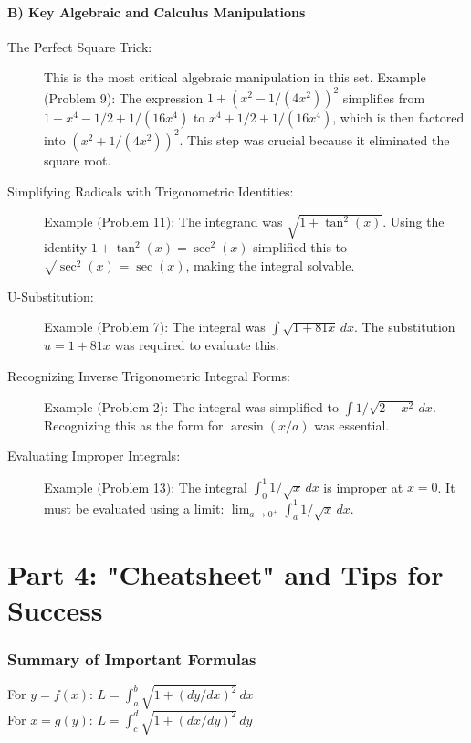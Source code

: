 \documentclass{article}
\begin{document}
\subsection*{B) Key Algebraic and Calculus Manipulations}
\begin{description}
    \item[The Perfect Square Trick:] This is the most critical algebraic manipulation in this set.
    \subitem Example (Problem 9): The expression $1 + (x^2 - 1/(4x^2))^2$ simplifies from $1 + x^4 - 1/2 + 1/(16x^4)$ to $x^4 + 1/2 + 1/(16x^4)$, which is then factored into $(x^2 + 1/(4x^2))^2$. This step was crucial because it eliminated the square root.
    
    \item[Simplifying Radicals with Trigonometric Identities:]
    \subitem Example (Problem 11): The integrand was $\sqrt{1 + \tan^2(x)}$. Using the identity $1 + \tan^2(x) = \sec^2(x)$ simplified this to $\sqrt{\sec^2(x)} = \sec(x)$, making the integral solvable.
    
    \item[U-Substitution:]
    \subitem Example (Problem 7): The integral was $\int\sqrt{1 + 81x} \,dx$. The substitution $u = 1 + 81x$ was required to evaluate this.
    
    \item[Recognizing Inverse Trigonometric Integral Forms:]
    \subitem Example (Problem 2): The integral was simplified to $\int 1 / \sqrt{2 - x^2} \,dx$. Recognizing this as the form for $\arcsin(x/a)$ was essential.
    
    \item[Evaluating Improper Integrals:]
    \subitem Example (Problem 13): The integral $\int_{0}^{1} 1/\sqrt{x} \,dx$ is improper at $x=0$. It must be evaluated using a limit: $\lim_{a\to0^+} \int_{a}^{1} 1/\sqrt{x} \,dx$.
\end{description}

\part*{Part 4: "Cheatsheet" and Tips for Success}
\section*{Summary of Important Formulas}
For $y = f(x)$: $L = \int_{a}^{b} \sqrt{1 + (dy/dx)^2} \,dx$ \\
For $x = g(y)$: $L = \int_{c}^{d} \sqrt{1 + (dx/dy)^2} \,dy$
\end{document}
